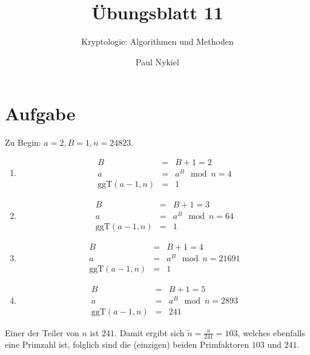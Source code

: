 \documentclass[DIN, pagenumber=false, fontsize=11pt, parskip=half]{scrartcl}
\title{Übungsblatt 11}
\subtitle{Kryptologie: Algorithmen und Methoden}
\author{Paul Nykiel}
\begin{document}
    \maketitle
    \section{Aufgabe}
    Zu Begin: $a=2, B=1, n=24823$.
    \begin{enumerate}
        \item
            \begin{eqnarray}
                B &=& B+1 = 2 \\
                a &=& a^B \mod n = 4 \\
                \text{ggT}(a-1, n) &=& 1 
            \end{eqnarray}
        \item
            \begin{eqnarray}
                B &=& B+1 = 3 \\
                a &=& a^B \mod n = 64 \\
                \text{ggT}(a-1, n) &=& 1 
            \end{eqnarray}
        \item
            \begin{eqnarray}
                B &=& B+1 = 4 \\
                a &=& a^B \mod n = 21691 \\
                \text{ggT}(a-1, n) &=& 1 
            \end{eqnarray}
        \item
            \begin{eqnarray}
                B &=& B+1 = 5 \\
                a &=& a^B \mod n = 2893 \\
                \text{ggT}(a-1, n) &=& 241 
            \end{eqnarray}
    \end{enumerate}
    Einer der Teiler von $n$ ist $241$. 
    Damit ergibt sich $\tilde{n} = \frac{n}{241} = 103$, welches ebenfalls eine
    Primzahl ist, folglich sind die (einzigen) beiden Primfaktoren $103$ und $241$.
\end{document}
